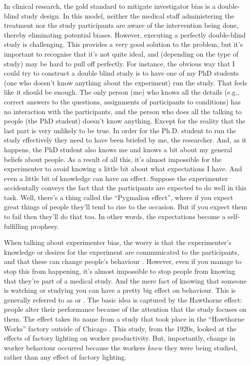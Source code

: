 In clinical research, the gold standard to mitigate investigator bias is a double-blind study design. In this model, neither the medical staff administering the treatment nor the study participants are aware of the intervention being done, thereby eliminating potential biases. However, executing a perfectly double-blind study is challenging. This provides a very good solution to the problem, but it's important to recognise that it's not quite ideal, and (depending on the type of study) may be hard to pull off perfectly. For instance, the obvious way that I could try to construct a double blind study is to have one of my PhD students (one who doesn't know anything about the experiment) run the study. That feels like it should be enough. The only person (me) who knows all the details (e.g., correct answers to the questions, assignments of participants to conditions) has no interaction with the participants, and the person who does all the talking to people (the PhD student) doesn't know anything. Except for the  reality that the last part is very unlikely to be true. In order for the Ph.D. student to run the study effectively they need to have been briefed by me, the researcher. And, as it happens, the PhD student also knows me and knows a bit about my general beliefs about people. As a result of all this, it's almost impossible for the experimenter to avoid knowing a little bit about what expectations I have. And even a little bit of knowledge can have an effect. Suppose the experimenter accidentally conveys the fact that the participants are expected to do well in this task. Well, there's a thing called the ``Pygmalion effect'', where if you expect great things of people they'll tend to rise to the occasion. But if you expect them to fail then they'll do that too. In other words, the expectations become a self-fulfilling prophesy.



When talking about experimenter bias, the worry is that the experimenter's knowledge or desires for the experiment are communicated to the participants, and that these can change people's behaviour \parencite{Rosenthal1966}. However, even if you manage to stop this from happening, it's almost impossible to stop people from knowing that they're part of a medical study. And the mere fact of knowing that someone is watching or studying you can have a pretty big effect on behaviour. This is generally referred to as  or . The basic idea is captured by the Hawthorne effect: people alter their performance because of the attention that the study focuses on them. The effect takes its name from a study that took place in the ``Hawthorne Works'' factory outside of Chicago \parencite[see][]{Adair1984}. This study, from the 1920s, looked at the effects of factory lighting on worker productivity. But, importantly, change in worker behaviour occurred because the workers {\it knew} they were being studied, rather than any effect of factory lighting.

